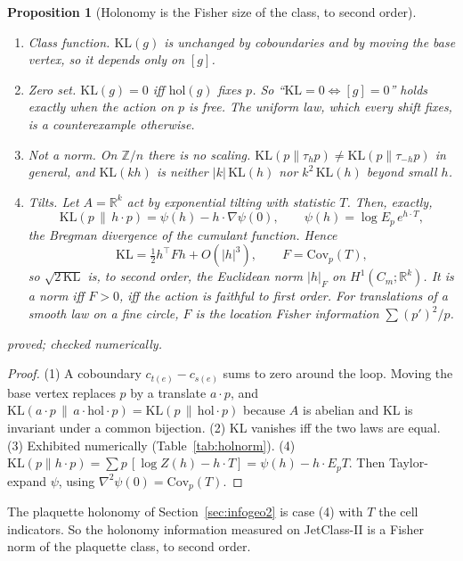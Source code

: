 \documentclass[11pt]{article}
\newtheorem{proposition}[theorem]{Proposition}
\theoremstyle{definition}
\theoremstyle{remark}
\newcommand{\Z}{\mathbb{Z}}
\newcommand{\R}{\mathbb{R}}
\newcommand{\st}[1]{\textsf{\small\color{gray}#1}}
\begin{document}
\begin{proposition}[Holonomy is the Fisher size of the class, to second order]\label{prop:holnorm}
\begin{enumerate}
  \item \emph{Class function.} $\mathrm{KL}(g)$ is unchanged by coboundaries and by moving the base vertex, so it depends only on $[g]$.
  \item \emph{Zero set.} $\mathrm{KL}(g)=0$ iff $\mathrm{hol}(g)$ fixes $p$. So ``$\mathrm{KL}=0\iff[g]=0$'' holds exactly when the action on $p$ is free. The uniform law, which every shift fixes, is a counterexample otherwise.
  \item \emph{Not a norm.} On $\Z/n$ there is no scaling. $\mathrm{KL}(p\|\tau_hp)\ne\mathrm{KL}(p\|\tau_{-h}p)$ in general, and $\mathrm{KL}(kh)$ is neither $|k|\,\mathrm{KL}(h)$ nor $k^2\,\mathrm{KL}(h)$ beyond small $h$.
  \item \emph{Tilts.} Let $A=\R^k$ act by exponential tilting with statistic $T$. Then, exactly,
  \[ \mathrm{KL}(p\,\|\,h\cdot p)=\psi(h)-h\cdot\nabla\psi(0),\qquad \psi(h)=\log E_p\,e^{h\cdot T}, \]
  the Bregman divergence of the cumulant function. Hence
  \[ \mathrm{KL}=\tfrac12 h^\top Fh+O(|h|^3),\qquad F=\mathrm{Cov}_p(T), \]
  so $\sqrt{2\,\mathrm{KL}}$ is, to second order, the Euclidean norm $|h|_F$ on $H^1(C_m;\R^k)$. It is a norm iff $F>0$, iff the action is faithful to first order. For translations of a smooth law on a fine circle, $F$ is the location Fisher information $\sum(p')^2/p$.
\end{enumerate}
\textup{\st{proved}; checked numerically.}
\end{proposition}
\begin{proof}
(1) A coboundary $c_{t(e)}-c_{s(e)}$ sums to zero around the loop. Moving the base vertex replaces $p$ by a translate $a\cdot p$, and $\mathrm{KL}(a\cdot p\,\|\,a\cdot\mathrm{hol}\cdot p)=\mathrm{KL}(p\,\|\,\mathrm{hol}\cdot p)$ because $A$ is abelian and KL is invariant under a common bijection.
(2) KL vanishes iff the two laws are equal.
(3) Exhibited numerically (Table~\ref{tab:holnorm}).
(4) $\mathrm{KL}(p\|h\cdot p)=\sum p\,[\log Z(h)-h\cdot T]=\psi(h)-h\cdot E_pT$. Then Taylor-expand $\psi$, using $\nabla^2\psi(0)=\mathrm{Cov}_p(T)$.
\end{proof}
The plaquette holonomy of Section~\ref{sec:infogeo2} is case (4) with $T$ the cell indicators. So the holonomy information measured on JetClass-II is a Fisher norm of the plaquette class, to second order.
\end{document}

